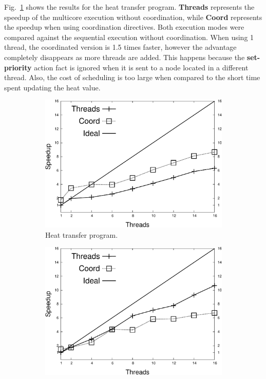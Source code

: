 Fig.~\ref{exp:heat-transfer} shows the results for the heat transfer program. \textbf{Threads} represents the speedup of the multicore execution
without coordination, while \textbf{Coord} represents the speedup when using coordination directives.
Both execution modes were compared against the sequential execution without coordination.
When using 1 thread, the coordinated version is 1.5 times
faster, however the advantage completely disappears as more threads are added. This happens because the \textbf{set-priority} action fact is ignored
when it is sent to a node located in a different thread. Also, the cost of scheduling is too large when compared to the short time spent
updating the heat value.

\begin{figure}[h!]
     \centering
   \begin{subfigure}[b]{0.4\textwidth}
      \includegraphics[width=\textwidth]{benchmarks/speedup_heat-transfer-80.pdf}
      \caption{Heat transfer program.}\label{exp:heat-transfer}
   \end{subfigure}
   \begin{subfigure}[b]{0.4\textwidth}
      \includegraphics[width=\textwidth]{new-benchmarks/speedup_shortest-uspowergrid.pdf}

\end{subfigure}
\end{figure}
